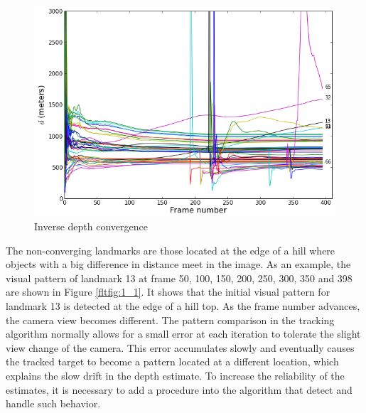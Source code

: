 \begin{figure}[h]
\centering
\includegraphics[width=12cm, keepaspectratio=true]{./Figures/fltfig/cut1/Figure10.png}
\caption{Inverse depth convergence}
\label{fltfig:1}
\end{figure}

The non-converging landmarks are those located at the edge of a hill
where objects with a big difference in distance meet in the image. As
an example, the visual pattern of landmark 13 at frame 50, 100, 150,
200, 250, 300, 350 and 398 are shown in Figure \ref{fltfig:1_1}. It
shows that the initial visual pattern for landmark 13 is detected at
the edge of a hill top. As the frame number advances, the camera view
becomes different. The pattern comparison in the tracking algorithm
normally allows for a small error at each iteration to tolerate the
slight view change of the camera. This error accumulates slowly and
eventually causes the tracked target to become a pattern located at a
different location, which explains the slow drift in the depth
estimate. To increase the reliability of the estimates, it is
necessary to add a procedure into the algorithm that detect and handle
such behavior.

